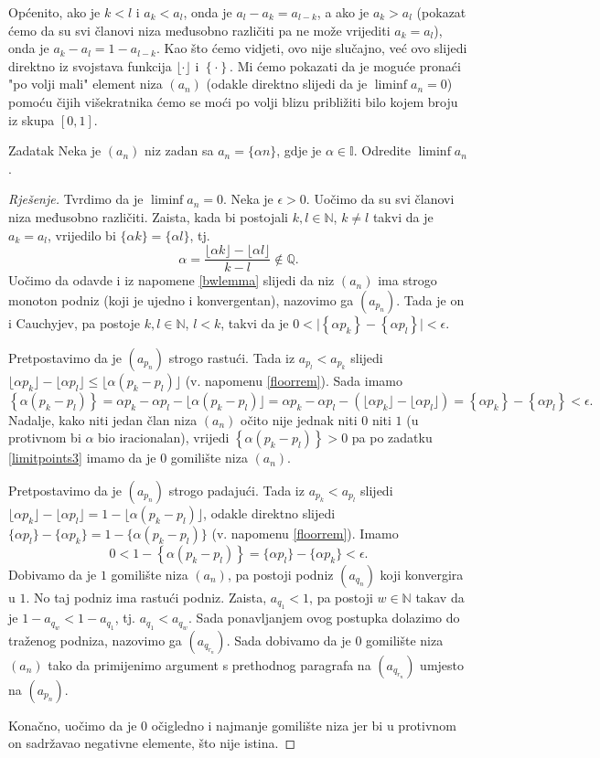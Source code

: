 Općenito, ako je $k<l$ i $a_k<a_l$, onda je $a_l-a_k=a_{l-k}$, a ako je $a_k>a_l$ (pokazat ćemo da su svi članovi niza međusobno različiti pa ne može vrijediti $a_k=a_l$), onda je $a_k-a_l=1-a_{l-k}$. Kao što ćemo vidjeti, ovo nije slučajno, već ovo slijedi direktno iz svojstava funkcija $\lfloor \cdot\rfloor$ i $\left\{\cdot\right\}$. Mi ćemo pokazati da je moguće pronaći "po volji mali" element niza $(a_n)$ (odakle direktno slijedi da je $\liminf{a_n}=0$) pomoću čijih višekratnika ćemo se moći po volji blizu približiti bilo kojem broju iz skupa $[0, 1]$.
\begin{exercise}{Zadatak}
\label{Dirichletapprox}
Neka je $(a_n)$ niz zadan sa $a_n=\{\alpha n\}$, gdje je $\alpha\in \mathbb{I}$. Odredite $\liminf{a_n}$.
\end{exercise}
\begin{proof}[Rješenje]
Tvrdimo da je $\liminf{a_n}=0$. Neka je $\epsilon>0$. Uočimo da su svi članovi niza međusobno različiti. Zaista, kada bi postojali $k, l\in \mathbb{N}$, $k\neq l$ takvi da je $a_k=a_l$, vrijedilo bi $\{\alpha k\}=\{\alpha l\}$, tj. 
$$\alpha=\dfrac{\lfloor \alpha k\rfloor-\lfloor \alpha l\rfloor}{k-l}\notin \mathbb{Q}.$$
Uočimo da odavde i iz napomene \ref{bwlemma} slijedi da niz $(a_n)$ ima strogo monoton podniz (koji je ujedno i konvergentan), nazovimo ga $(a_{p_n})$. Tada je on i Cauchyjev, pa postoje $k, l\in \mathbb{N}$, $l<k$, takvi da je $0<\lvert\left\{\alpha p_k\right\}-\left\{\alpha p_l\right\}\rvert<\epsilon$.

Pretpostavimo da je $(a_{p_n})$ strogo rastući. Tada iz $a_{p_l}<a_{p_k}$ slijedi $\lfloor \alpha p_k\rfloor-\lfloor \alpha p_l\rfloor\leq \lfloor \alpha (p_k-p_l)\rfloor$ (v. napomenu \ref{floorrem}). Sada imamo
$$\left\{\alpha(p_k-p_l)\right\}=\alpha p_k-\alpha p_l-\lfloor \alpha(p_k-p_l)\rfloor= \alpha p_k-\alpha p_l-\left(\lfloor \alpha p_k\rfloor-\lfloor \alpha p_l\rfloor\right)=\left\{\alpha p_k\right\}-\left\{\alpha p_l\right\}<\epsilon.$$
Nadalje, kako niti jedan član niza $(a_n)$ očito nije jednak niti $0$ niti $1$ (u protivnom bi $\alpha$ bio iracionalan), vrijedi $\left\{\alpha(p_k-p_l)\right\}>0$ pa po zadatku \ref{limitpoints3} imamo da je $0$ gomilište niza $(a_n)$. 

Pretpostavimo da je $(a_{p_n})$ strogo padajući. Tada iz $a_{p_k}<a_{p_l}$ slijedi $\lfloor \alpha p_k\rfloor-\lfloor \alpha p_l\rfloor=1-\lfloor \alpha (p_k-p_l)\rfloor$, odakle direktno slijedi $\{\alpha p_l\}-\{\alpha p_k\}=1-\{\alpha (p_k-p_l)\}$ (v. napomenu \ref{floorrem}).
Imamo
$$0<1-\left\{\alpha(p_k-p_l)\right\}=\{\alpha p_l\}-\{\alpha p_k\}<\epsilon.$$
Dobivamo da je $1$ gomilište niza $(a_n)$, pa postoji podniz $(a_{q_n})$ koji konvergira u $1$. No taj podniz ima rastući podniz. Zaista, $a_{q_1}<1$, pa postoji $w\in \mathbb{N}$ takav da je $1-a_{q_w}<1-a_{q_1}$, tj. $a_{q_1}<a_{q_w}$. Sada ponavljanjem ovog postupka dolazimo do traženog podniza, nazovimo ga $\left(a_{q_{r_n}}\right)$. Sada dobivamo da je $0$ gomilište niza $(a_n)$ tako da primijenimo argument s prethodnog paragrafa na $\left(a_{q_{r_n}}\right)$ umjesto na $(a_{p_n})$.

Konačno, uočimo da je $0$ očigledno i najmanje gomilište niza jer bi u protivnom on sadržavao negativne elemente, što nije istina.
\end{proof}

